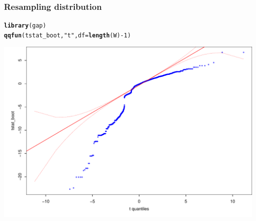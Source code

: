 \documentclass{beamer}\usepackage[]{graphicx}\usepackage[]{color}
\makeatletter
\newcommand{\hlnum}[1]{\textcolor[rgb]{0.2,0.2,0.2}{#1}}%
\newcommand{\hlstr}[1]{\textcolor[rgb]{0.2,0.2,0.2}{#1}}%
\newcommand{\hlopt}[1]{\textcolor[rgb]{0.102,0.102,0.102}{#1}}%
\newcommand{\hlstd}[1]{\textcolor[rgb]{0.102,0.102,0.102}{#1}}%
\newcommand{\hlkwc}[1]{\textcolor[rgb]{0.2,0.2,0.2}{#1}}%
\newcommand{\hlkwd}[1]{\textcolor[rgb]{0.102,0.102,0.102}{\textbf{#1}}}%
\newenvironment{kframe}{%
 \def\at@end@of@kframe{}%
 \ifinner\ifhmode%
  \def\at@end@of@kframe{\end{minipage}}%
  \begin{minipage}{\columnwidth}%
 \fi\fi%
 \def\FrameCommand##1{\hskip\@totalleftmargin \hskip-\fboxsep
 \colorbox{shadecolor}{##1}\hskip-\fboxsep
     \hskip-\linewidth \hskip-\@totalleftmargin \hskip\columnwidth}%
 \MakeFramed {\advance\hsize-\width
   \@totalleftmargin\z@ \linewidth\hsize
   \@setminipage}}%
 {\par\unskip\endMakeFramed%
 \at@end@of@kframe}
\newenvironment{knitrout}{}{} %
\renewenvironment{knitrout}{\begin{spacing}{0.75}\begin{tiny}}{\end{tiny}\end{spacing}}
\makeatother
\begin{document}
\begin{frame}[fragile]
\frametitle{Resampling distribution}

\begin{knitrout}\small
{}\color{fgcolor}\begin{kframe}
\begin{alltt}
\hlkwd{library}\hlstd{(gap)}
\hlkwd{qqfun}\hlstd{(tstat_boot,} \hlstr{"t"}\hlstd{,} \hlkwc{df}\hlstd{=}\hlkwd{length}\hlstd{(W)}\hlopt{-}\hlnum{1}\hlstd{)}
\end{alltt}
\end{kframe}

{\centering \includegraphics[width=0.99\linewidth]{figure/graphics-unnamed-chunk-3-1} 

}



\end{knitrout}

\end{frame}
\end{document}
